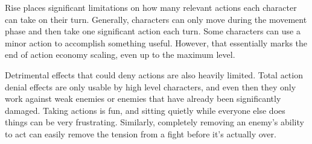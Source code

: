     Rise places significant limitations on how many relevant actions each character can take on their turn.
    Generally, characters can only move during the movement phase and then take one significant action each turn.
    Some characters can use a minor action to accomplish something useful.
    However, that essentially marks the end of action economy scaling, even up to the maximum level.

    Detrimental effects that could deny actions are also heavily limited.
    Total action denial effects are only usable by high level characters, and even then they only work against weak enemies or enemies that have already been significantly damaged.
    Taking actions is fun, and sitting quietly while everyone else does things can be very frustrating.
    Similarly, completely removing an enemy's ability to act can easily remove the tension from a fight before it's actually over.
